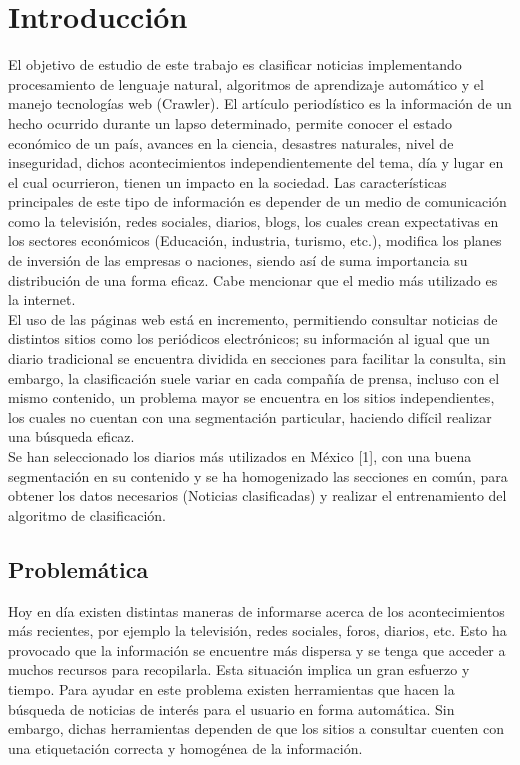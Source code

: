 
\chapter{Introducción}

El objetivo de estudio de este trabajo es clasificar noticias implementando procesamiento de lenguaje natural, algoritmos de aprendizaje automático y el manejo tecnologías web (Crawler). El artículo periodístico es la información de un hecho ocurrido durante un lapso determinado, permite conocer el estado económico de un país, avances en la ciencia, desastres naturales, nivel de inseguridad, dichos acontecimientos independientemente del tema, día y lugar en el cual ocurrieron, tienen un impacto en la sociedad. Las características principales de este tipo de información es depender de un medio de comunicación como la televisión, redes sociales, diarios, blogs, los cuales crean expectativas en los sectores económicos (Educación, industria, turismo, etc.), modifica los planes de inversión de las empresas o naciones, siendo así de suma importancia su distribución de una forma eficaz. Cabe mencionar que el medio más utilizado es la internet.\\

El uso de las páginas web está en incremento, permitiendo consultar noticias de distintos sitios como los periódicos electrónicos; su información al igual que un diario tradicional se encuentra dividida en secciones para facilitar la consulta, sin embargo, la clasificación suele variar en cada compañía de prensa, incluso con el mismo contenido, un problema mayor se encuentra en los sitios independientes, los cuales no cuentan con una segmentación particular, haciendo difícil realizar una búsqueda eficaz.\\

Se han seleccionado los diarios más utilizados en México [1], con una buena segmentación en su contenido y se ha homogenizado las secciones en común, para obtener los datos necesarios (Noticias clasificadas) y realizar el entrenamiento del algoritmo de clasificación.


\section{Problemática}

Hoy en día existen distintas maneras de informarse acerca de los acontecimientos más recientes, por ejemplo la televisión, redes sociales, foros, diarios, etc. Esto ha provocado que la información se encuentre más dispersa y se tenga que acceder a muchos recursos para recopilarla. Esta situación implica un gran esfuerzo y tiempo. Para ayudar en este problema existen herramientas que hacen la búsqueda de noticias de interés para el usuario en forma automática. Sin embargo, dichas herramientas dependen de que los sitios a consultar cuenten con una etiquetación correcta y homogénea de la información.\\

